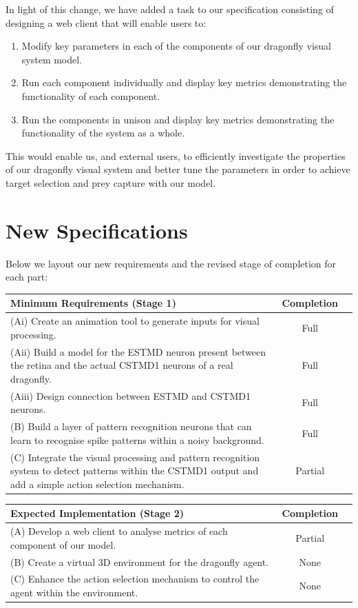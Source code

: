 \documentclass[a4paper,11pt]{article}
\begin{document}
In light of this change, we have added a task to our specification consisting of designing a web client that will enable users to:
\begin{enumerate}
	\item Modify key parameters in each of the components of our dragonfly visual system model.
	\item Run each component individually and display key metrics demonstrating the functionality of each component.
	\item Run the components in unison and display key metrics demonstrating the functionality of the system as a whole.
\end{enumerate}
This would enable us, and external users, to efficiently investigate the properties of our dragonfly visual system and better tune the parameters in order to achieve target selection and prey capture with our model.

\section{New Specifications}
Below we layout our new requirements and the revised stage of completion for each part:
\begin{center}
    \begin{tabular}{p{12cm} c c}
    \textbf{Minimum Requirements (Stage 1)} & \textbf{Completion} \\ \hline
    (Ai) Create an animation tool to generate inputs for visual processing. & Full \\ 
	(Aii) Build a model for the ESTMD neuron present between the retina and the actual CSTMD1 neurons of a real dragonfly. & Full \\
	(Aiii) Design connection between ESTMD and CSTMD1 neurons. & Full \\
	(B) Build a layer of pattern recognition neurons that can learn to recognise spike patterns within a noisy background. & Full\\
	(C) Integrate the visual processing and pattern recognition system to detect patterns within the CSTMD1 output and add a simple action selection mechanism. & Partial\\
    \end{tabular}
\end{center}

\begin{center}
    \begin{tabular}{p{12cm} c c}
    \textbf{Expected Implementation (Stage 2)} & \textbf{Completion} \\ \hline
	(A) Develop a web client to analyse metrics of each component of our model. & Partial \\
	(B) Create a virtual 3D environment for the dragonfly agent. & None\\
	(C) Enhance the action selection mechanism to control the agent within the environment. & None\\
    \end{tabular}
\end{center}
\end{document}
